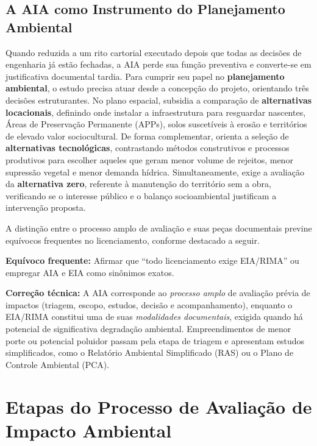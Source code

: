 \subsection{A AIA como Instrumento do Planejamento Ambiental}

Quando reduzida a um rito cartorial executado depois que todas as decisões de engenharia já estão fechadas, a AIA perde sua função preventiva e converte-se em justificativa documental tardia. Para cumprir seu papel no \textbf{planejamento ambiental}, o estudo precisa atuar desde a concepção do projeto, orientando três decisões estruturantes. No plano espacial, subsidia a comparação de \textbf{alternativas locacionais}, definindo onde instalar a infraestrutura para resguardar nascentes, Áreas de Preservação Permanente (APPs), solos suscetíveis à erosão e territórios de elevado valor sociocultural. De forma complementar, orienta a seleção de \textbf{alternativas tecnológicas}, contrastando métodos construtivos e processos produtivos para escolher aqueles que geram menor volume de rejeitos, menor supressão vegetal e menor demanda hídrica. Simultaneamente, exige a avaliação da \textbf{alternativa zero}, referente à manutenção do território sem a obra, verificando se o interesse público e o balanço socioambiental justificam a intervenção proposta.

A distinção entre o processo amplo de avaliação e suas peças documentais previne equívocos frequentes no licenciamento, conforme destacado a seguir.

\begin{boxErro}
  \textbf{Equívoco frequente:} Afirmar que ``todo licenciamento exige EIA/RIMA'' ou empregar AIA e EIA como sinônimos exatos.\par
  \textbf{Correção técnica:} A AIA corresponde ao \emph{processo amplo} de avaliação prévia de impactos (triagem, escopo, estudos, decisão e acompanhamento), enquanto o EIA/RIMA constitui uma de suas \emph{modalidades documentais}, exigida quando há potencial de significativa degradação ambiental. Empreendimentos de menor porte ou potencial poluidor passam pela etapa de triagem e apresentam estudos simplificados, como o Relatório Ambiental Simplificado (RAS) ou o Plano de Controle Ambiental (PCA).
\end{boxErro}

\section{Etapas do Processo de Avaliação de Impacto Ambiental}

